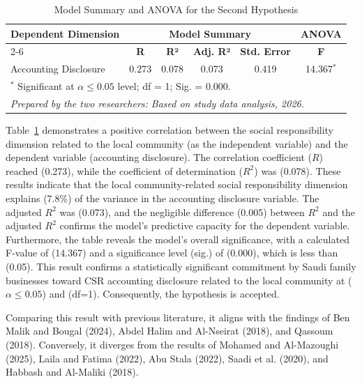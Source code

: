 \documentclass[10pt]{NSP1}
\begin{document}
	\begin{table}[H]
		\centering
		\caption{Model Summary and ANOVA for the Second Hypothesis}
		\label{tab:h2}
		\vspace{5pt}
		\small
		\begin{tabular}{lccccc}
			\hline
			\multirow{2}{*}{\textbf{Dependent Dimension}} & \multicolumn{4}{c}{\textbf{Model Summary}} & \multicolumn{1}{c}{\textbf{ANOVA}} \\
			\cline{2-6}
			& \textbf{R} & \textbf{R²} & \textbf{Adj. R²} & \textbf{Std. Error} & \textbf{F} \\
			\hline
			Accounting Disclosure & 0.273 & 0.078 & 0.073 & 0.419 & 14.367\(^{*}\) \\
			\hline
			\multicolumn{6}{l}{\footnotesize \(^{*}\) Significant at \(\alpha \leq 0.05\) level; df = 1; Sig. = 0.000.} \\
			\multicolumn{6}{l}{\footnotesize \textit{Prepared by the two researchers: Based on study data analysis, 2026.}} \\
		\end{tabular}
	\end{table}
	
	Table~\ref{tab:h2} demonstrates a positive correlation between the social responsibility dimension related to the local community (as the independent variable) and the dependent variable (accounting disclosure). The correlation coefficient (\(R\)) reached (0.273), while the coefficient of determination (\(R^2\)) was (0.078). These results indicate that the local community-related social responsibility dimension explains (7.8\%) of the variance in the accounting disclosure variable. The adjusted \(R^2\) was (0.073), and the negligible difference (0.005) between \(R^2\) and the adjusted \(R^2\) confirms the model's predictive capacity for the dependent variable. Furthermore, the table reveals the model's overall significance, with a calculated F-value of (14.367) and a significance level (sig.) of (0.000), which is less than (0.05). This result confirms a statistically significant commitment by Saudi family businesses toward CSR accounting disclosure related to the local community at (\(\alpha \leq 0.05\)) and (df=1). Consequently, the hypothesis is accepted.
	
	Comparing this result with previous literature, it aligns with the findings of Ben Malik and Bougal (2024), Abdel Halim and Al-Nseirat (2018), and Qassoum (2018). Conversely, it diverges from the results of Mohamed and Al-Mazoughi (2025), Laila and Fatima (2022), Abu Stala (2022), Saadi et al. (2020), and Habbash and Al-Maliki (2018).
	
\end{document}
